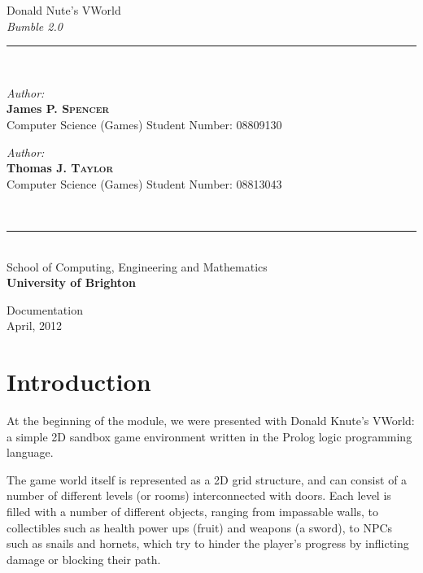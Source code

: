 \documentclass[a4paper,oneside]{report}
\newcommand{\HRuleLight}{\rule{\linewidth}{0.1mm}}
\begin{document}
%
%
\begin{titlepage}
\begin{center}

\Huge Donald Nute's VWorld\\ 
\huge \emph{Bumble 2.0}

\HRuleLight\\[0.5cm]

\begin{minipage}{0.45\textwidth}
	\begin{flushleft}\large
		\emph{Author:}\\
			\textbf{James P. \textsc{Spencer}}\\[0.27cm]
			Computer Science (Games)
			Student Number: 08809130
	\end{flushleft}
\end{minipage}
\begin{minipage}{0.45\textwidth}
	\begin{flushright}\large
		\emph{Author:}\\
			\textbf{Thomas J. \textsc{Taylor}}\\[0.27cm]
			Computer Science (Games)
			Student Number: 08813043
	\end{flushright}
\end{minipage}\\[0.75cm] 

\HRuleLight\\[0.2cm]

\large School of Computing, Engineering and Mathematics\\ \textbf{University of Brighton}

\vfill
\huge Documentation\\
\large April, 2012\\

\end{center}
\end{titlepage}

\setcounter{page}{1}

\section{Introduction}

At the beginning of the module, we were presented with Donald Knute's VWorld: a simple 2D sandbox game environment written in the Prolog logic programming language.

The game world itself is represented as a 2D grid structure, and can consist of a number of different levels (or rooms) interconnected with doors. Each level is filled with a number of different objects, ranging from impassable walls, to collectibles such as health power ups (fruit) and weapons (a sword), to NPCs such as snails and hornets, which try to hinder the player's progress by inflicting damage or blocking their path. 
\end{document}
